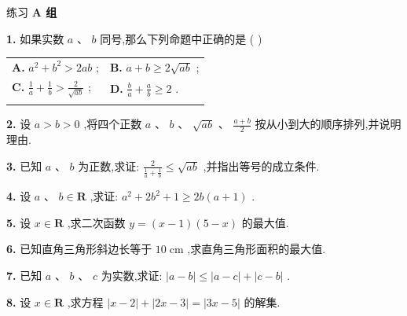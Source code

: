 \documentclass[a4paper,10pt,oneside,fontset=none]{ctexbook}
\renewcommand{\geq}{\geqslant}
\renewcommand{\leq}{\leqslant}
\newenvironment{exercise}[1][]{\begin{exBox}{练习}{#1}}{\end{exBox}}
\numberwithin{equation}{chapter}
\begin{document}
\begin{exercise}
\textbf{A 组}\par\vspace{0.5em}
\textbf{1.} 如果实数 $a\text{ 、 }b$ 同号,那么下列命题中正确的是 ( )
\par\vspace{0.3em}
\begin{center}
\begin{tabular}{@{}p{}p{}@{}}
\textbf{A.} ${a}^{2} + {b}^{2} > {2ab}$ ; & \textbf{B.} $a + b \geq  2\sqrt{ab}$ ; \\\vspace{0.2em}
\textbf{C.} $\frac{1}{a} + \frac{1}{b} > \frac{2}{\sqrt{ab}}$ ; & \textbf{D.} $\frac{b}{a} + \frac{a}{b} \geq  2$ . \\\vspace{0.2em}
\end{tabular}
\end{center}
\par\vspace{0.8em}
\textbf{2.} 设 $a > b > 0$ ,将四个正数 $a\text{ 、 }b\text{ 、 }\sqrt{ab}\text{ 、 }\frac{a + b}{2}$ 按从小到大的顺序排列,并说明理由.
\par\vspace{0.8em}
\textbf{3.} 已知 $a\text{ 、 }b$ 为正数,求证: $\frac{2}{\frac{1}{a} + \frac{1}{b}} \leq  \sqrt{ab}$ ,并指出等号的成立条件.
\par\vspace{0.8em}
\textbf{4.} 设 $a\text{ 、 }b \in  \mathbf{R}$ ,求证: ${a}^{2} + 2{b}^{2} + 1 \geq  {2b}\left( {a + 1}\right)$ .
\par\vspace{0.8em}
\textbf{5.} 设 $x \in  \mathbf{R}$ ,求二次函数 $y = \left( {x - 1}\right) \left( {5 - x}\right)$ 的最大值.
\par\vspace{0.8em}
\textbf{6.} 已知直角三角形斜边长等于 ${10}\mathrm{\;{cm}}$ ,求直角三角形面积的最大值.
\par\vspace{0.8em}
\textbf{7.} 已知 $a\text{ 、 }b\text{ 、 }c$ 为实数,求证: $\left| {a - b}\right|  \leq  \left| {a - c}\right|  + \left| {c - b}\right|$ .
\par\vspace{0.8em}
\textbf{8.} 设 $x \in  \mathbf{R}$ ,求方程 $\left| {x - 2}\right|  + \left| {{2x} - 3}\right|  = \left| {{3x} - 5}\right|$ 的解集.
\end{exercise}
\end{document}
